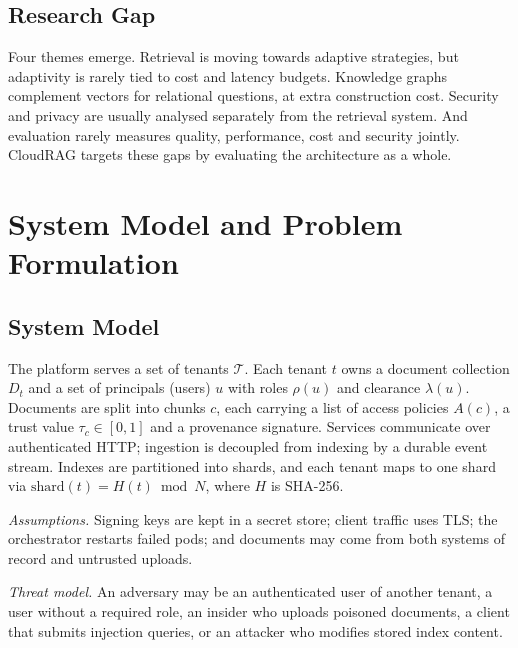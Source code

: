 \documentclass[journal]{IEEEtran}
\begin{document}
\subsection{Research Gap}
Four themes emerge. Retrieval is moving towards adaptive strategies, but adaptivity is rarely tied to
cost and latency budgets. Knowledge graphs complement vectors for relational questions, at extra
construction cost. Security and privacy are usually analysed separately from the retrieval system. And
evaluation rarely measures quality, performance, cost and security jointly. CloudRAG targets these gaps
by evaluating the architecture as a whole.

\section{System Model and Problem Formulation}

\subsection{System Model}
The platform serves a set of tenants $\mathcal{T}$. Each tenant $t$ owns a document collection $D_t$ and
a set of principals (users) $u$ with roles $\rho(u)$ and clearance $\lambda(u)$. Documents are split into
chunks $c$, each carrying a list of access policies $A(c)$, a trust value $\tau_c\in[0,1]$ and a
provenance signature. Services communicate over authenticated HTTP; ingestion is decoupled from
indexing by a durable event stream. Indexes are partitioned into shards, and each tenant maps to one
shard via $\mathrm{shard}(t)=H(t)\bmod N$, where $H$ is SHA-256.

\textit{Assumptions.} Signing keys are kept in a secret store; client traffic uses TLS; the
orchestrator restarts failed pods; and documents may come from both systems of record and untrusted
uploads.

\textit{Threat model.} An adversary may be an authenticated user of another tenant, a user without a
required role, an insider who uploads poisoned documents, a client that submits injection queries, or an
attacker who modifies stored index content.
\end{document}
